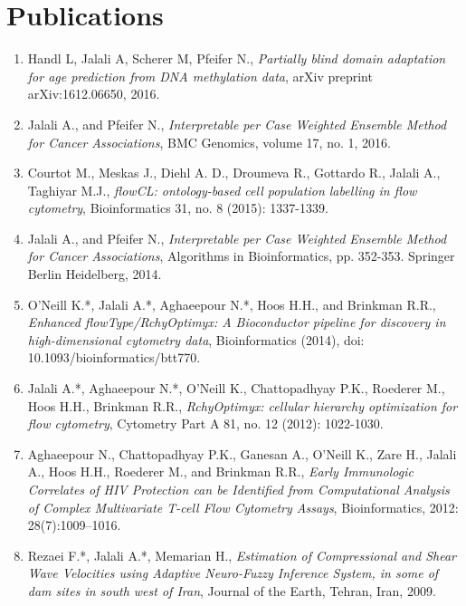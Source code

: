\documentclass[11pt,a4paper,sans]{moderncv} %
\begin{document}
\renewcommand{\listitemsymbol}{-~} %


\section{Publications}

\begin{enumerate}
\item Handl L, Jalali A, Scherer M, Pfeifer N., \emph{Partially blind domain adaptation for age prediction from DNA methylation data}, arXiv preprint arXiv:1612.06650, 2016.
  
\item Jalali A., and Pfeifer N., \emph{Interpretable per Case Weighted Ensemble Method for Cancer Associations}, BMC Genomics, volume 17, no. 1, 2016.

\item Courtot M., Meskas J., Diehl A. D., Droumeva R., Gottardo R., Jalali A., Taghiyar M.J., \emph{flowCL: ontology-based cell population labelling in flow cytometry}, Bioinformatics 31, no. 8 (2015): 1337-1339.

\item Jalali A., and Pfeifer N., \emph{Interpretable per Case Weighted Ensemble Method for Cancer Associations}, Algorithms in Bioinformatics, pp. 352-353. Springer Berlin Heidelberg, 2014.

\item O'Neill K.*, Jalali A.*, Aghaeepour N.*, Hoos H.H., and Brinkman R.R., \emph{Enhanced flowType/RchyOptimyx: A Bioconductor pipeline for discovery in high-dimensional cytometry data}, Bioinformatics (2014), doi: 10.1093/bioinformatics/btt770.

\item Jalali A.*, Aghaeepour N.*, O'Neill K., Chattopadhyay P.K., Roederer M., Hoos H.H., Brinkman R.R., \emph{RchyOptimyx: cellular hierarchy optimization for flow cytometry}, Cytometry Part A 81, no. 12 (2012): 1022-1030.

\item Aghaeepour N., Chattopadhyay P.K., Ganesan A., O'Neill K., Zare H., Jalali A., Hoos H.H., Roederer M., and Brinkman R.R., \emph{Early Immunologic Correlates of HIV Protection can be Identiﬁed from Computational Analysis of Complex Multivariate T-cell Flow Cytometry Assays},
Bioinformatics, 2012: 28(7):1009–1016.

\item Rezaei F.*, Jalali A.*, Memarian H., \emph{Estimation of Compressional and Shear Wave Velocities using Adaptive Neuro-Fuzzy Inference System, in some of dam sites in south west of Iran}, Journal of the Earth, Tehran, Iran, 2009.


\end{enumerate}
\end{document}
